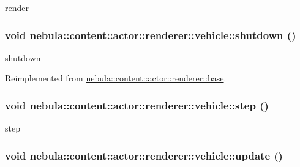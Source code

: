 render \hypertarget{classnebula_1_1content_1_1actor_1_1renderer_1_1vehicle_a3fb75f250202b758a8963b7c2e8a8f38}{
\subsubsection[{shutdown}]{\setlength{\rightskip}{0pt plus 5cm}void nebula::content::actor::renderer::vehicle::shutdown ()}}
\label{classnebula_1_1content_1_1actor_1_1renderer_1_1vehicle_a3fb75f250202b758a8963b7c2e8a8f38}


shutdown 

Reimplemented from \hyperlink{classnebula_1_1content_1_1actor_1_1renderer_1_1base_abb61c46f573309a2f96a7fe6b95f5cd3}{nebula::content::actor::renderer::base}.\hypertarget{classnebula_1_1content_1_1actor_1_1renderer_1_1vehicle_a049d0ca0d8b024d8a39c9b03e7c05d66}{
\subsubsection[{step}]{\setlength{\rightskip}{0pt plus 5cm}void nebula::content::actor::renderer::vehicle::step ()}}
\label{classnebula_1_1content_1_1actor_1_1renderer_1_1vehicle_a049d0ca0d8b024d8a39c9b03e7c05d66}


step \hypertarget{classnebula_1_1content_1_1actor_1_1renderer_1_1vehicle_a46a276a1d4340857f6d11927d5127d56}{
\subsubsection[{update}]{\setlength{\rightskip}{0pt plus 5cm}void nebula::content::actor::renderer::vehicle::update ()}}
\label{classnebula_1_1content_1_1actor_1_1renderer_1_1vehicle_a46a276a1d4340857f6d11927d5127d56}


